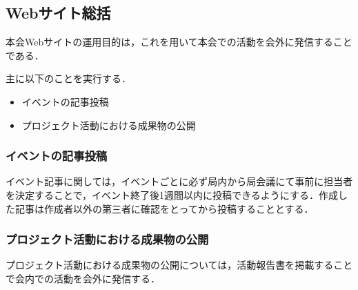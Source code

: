 \subsection*{Webサイト総括}


本会Webサイトの運用目的は，これを用いて本会での活動を会外に発信することである．

主に以下のことを実行する．
\begin{itemize}
\item イベントの記事投稿
\item プロジェクト活動における成果物の公開
\end{itemize}

\subsubsection*{イベントの記事投稿}
イベント記事に関しては，イベントごとに必ず局内から局会議にて事前に担当者を決定することで，イベント終了後1週間以内に投稿できるようにする．作成した記事は作成者以外の第三者に確認をとってから投稿することとする．

\subsubsection*{プロジェクト活動における成果物の公開}
プロジェクト活動における成果物の公開については，活動報告書を掲載することで会内での活動を会外に発信する．

